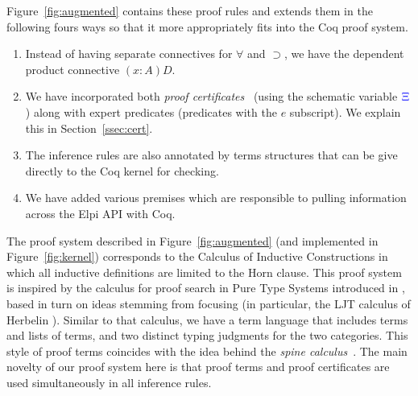 Figure~\ref{fig:augmented} contains these proof rules and extends them
in the following fours ways so that it more appropriately fits into
the Coq proof system.
\begin{enumerate}
  \item Instead of having separate connectives for $\forall$ and
    $\supset$, we have the dependent product connective $(x:A)D$. 
  \item We have incorporated both \emph{proof certificates}~\cite{chihani17jar} (using the
    schematic variable ${\color{blue}{\Xi}}$) along with expert predicates
    (predicates with the $e$ subscript). We explain this in Section~\ref{ssec:cert}.
  \item The inference rules are also annotated by terms structures that
    can be give directly to the Coq kernel for checking.
  \item We have added various premises which are responsible to
    pulling information across the Elpi API with Coq.
\end{enumerate}
The proof system described in Figure~\ref{fig:augmented} (and
implemented in Figure~\ref{fig:kernel}) corresponds to the Calculus
of Inductive Constructions in which all inductive definitions are
limited to the Horn clause.
%
This proof system is inspired by the calculus for proof search in
Pure Type Systems introduced in \cite{LengrandDM06}, based in turn on
ideas stemming from focusing (in particular, the LJT calculus of
Herbelin \cite{Herbelin94}). Similar to that calculus, we have a
term language that includes terms and lists of terms, and two distinct
typing judgments for the two categories.
%
This style of  proof terms coincides with the idea behind the \emph{spine
  calculus}~\cite{Cervesato97tr}.  The main novelty of our proof
system here is that proof terms and proof certificates are used
simultaneously in all inference rules.

